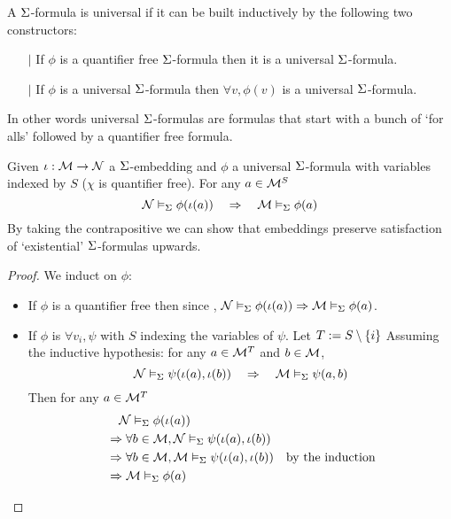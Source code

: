 \begin{dfn}
    A $\Sigma$-formula is universal if it can be 
    built inductively by the following two constructors:
    \begin{itemize}
        \item[$\vert$] If $\phi$ is a quantifier free $\Sigma$-formula 
        then it is a universal $\Sigma$-formula.
        \item[$\vert$] If $\phi$ is a universal $\Sigma$-formula then
        $\forall v, \phi(v)$ is a universal $\Sigma$-formula.
    \end{itemize}
    In other words universal $\Sigma$-formulas are formulas that start with 
    a bunch of `for alls' followed by a quantifier free formula.
\end{dfn}

\begin{prop}
    Given $\iota : \mathcal{M} \to \mathcal{N}$ a $\Sigma$-embedding and
    $\phi$ a universal $\Sigma$-formula with 
    variables indexed by $S$ ($\chi$ is quantifier free).
    For any $a \in \mathcal{M}^S$
    \[
        \mathcal{N} \vDash_{\Sigma} \phi(\iota(a)) \quad \Rightarrow \quad
        \mathcal{M} \vDash_{\Sigma} \phi(a)
    \]
    By taking the contrapositive we can show that embeddings
    preserve satisfaction of `existential' $\Sigma$-formulas upwards.
\end{prop}
\begin{proof}
    We induct on $\phi$:
    \begin{itemize}
        \item If $\phi$ is a quantifier free then since 
        , 
        $\mathcal{N} \vDash_{\Sigma} \phi(\iota(a)) \Rightarrow
        \mathcal{M} \vDash_{\Sigma} \phi(a)$.
        \item If $\phi$ is $\forall v_i, \psi$ with $S$ indexing the variables
        of $\psi$. 
        Let $T := S \setminus \left\{i\right\}$
        Assuming the inductive hypothesis: 
        for any $a \in {\mathcal{M}}^T$ and 
        $b \in {\mathcal{M}}$,
        \[\mathcal{N} \vDash_{\Sigma} \psi(\iota(a),\iota(b)) \quad \Rightarrow \quad
        \mathcal{M} \vDash_{\Sigma} \psi(a,b)\]
        Then for any $a \in {\mathcal{M}}^T$
        \begin{align*}
            &\quad \mathcal{N} \vDash_{\Sigma} \phi(\iota(a))\\
            &\Rightarrow \forall b \in {\mathcal{M}}, 
            \mathcal{N} \vDash_{\Sigma} \psi(\iota(a),\iota(b)) \\
            &\Rightarrow \forall b \in {\mathcal{M}}, 
            \mathcal{M} \vDash_{\Sigma} \psi(\iota(a),\iota(b)) & \text{by the induction}\\
            &\Rightarrow \mathcal{M} \vDash_{\Sigma} \phi(a)
        \end{align*}
    \end{itemize}
\end{proof}

